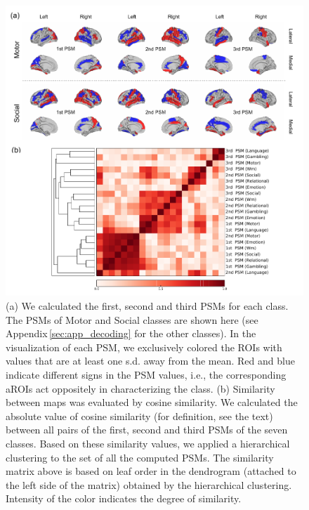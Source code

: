 \begin{figure}[htpb]
\begin{center}
\includegraphics[width=1.\columnwidth]{figures/psa_final/psa_and_similarity.pdf}
\caption{\label{fig:PSA}
(a)
We calculated the first, second and third PSMs for each class. The PSMs
 of Motor and Social classes are shown here (see Appendix\,\ref{sec:app_decoding} for the other classes).
In the visualization of each PSM, we exclusively colored the ROIs with values that are at least one s.d. away from the mean.
Red and blue indicate different signs in the PSM values, i.e., the corresponding aROIs act oppositely in characterizing the class.
(b)
Similarity between maps was evaluated by cosine similarity.
We calculated the absolute value of cosine similarity (for definition,
 see the text) between all pairs of the first, second and third  PSMs of the seven classes. Based on these similarity values, we applied a hierarchical clustering to the set of all the computed PSMs.
The similarity matrix above is based on leaf order in the dendrogram (attached to the left side of the matrix) obtained by the hierarchical clustering. Intensity of the color indicates the degree of similarity.
}
\end{center}
\end{figure}
